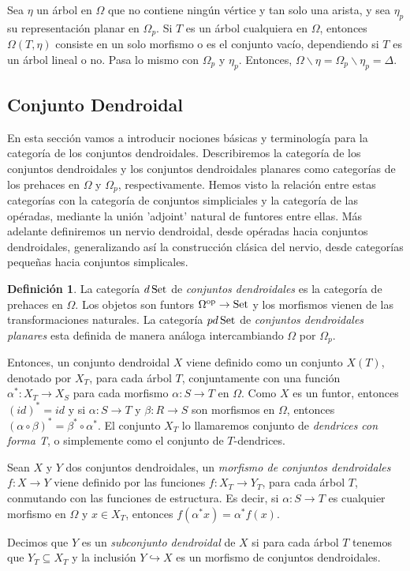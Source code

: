 \documentclass[11pt,a4paper,openright,oneside]{article}
\numberwithin{equation}{section}
\theoremstyle{definition}
\newtheorem{defi}[teo]{Definici\'on}
\newcommand{\Set}{\mathop{\rm Set}}
\begin{document}
Sea $\eta$ un \'arbol en $\Omega$ que no contiene ning\'un v\'ertice y tan solo una arista, y sea $\eta_p$ su representaci\'on planar en $\Omega_p$.
Si $T$ es un \'arbol cualquiera en $\Omega$, entonces $\Omega(T,\eta)$ consiste en un solo morfismo o es el conjunto vac\'io, dependiendo si $T$ es un \'arbol lineal o no. Pasa lo mismo con $\Omega_p$ y $\eta_p$. Entonces, $\Omega\backslash\eta = \Omega_p\backslash\eta_p = \Delta$.

\subsection{Conjunto Dendroidal}
En esta secci\'on vamos a introducir nociones b\'asicas y terminolog\'ia para la categor\'ia de los conjuntos dendroidales. Describiremos la categor\'ia de los conjuntos dendroidales y los conjuntos dendroidales planares como categor\'ias de los prehaces en $\Omega$ y $\Omega_p$, respectivamente.
Hemos visto la relaci\'on entre estas categor\'ias con la categor\'ia de conjuntos simpliciales y la categor\'ia de las op\'eradas, mediante la uni\'on 'adjoint' natural de funtores entre ellas. M\'as adelante definiremos un nervio dendroidal, desde op\'eradas hacia conjuntos dendroidales, generalizando as\'i la construcci\'on cl\'asica del nervio, desde categor\'ias peque\~{n}as hacia conjuntos simplicales.

\begin{defi}
    La categor\'ia $d\Set$ de \emph{conjuntos dendroidales} es la categor\'ia de prehaces en $\Omega$. Los objetos son funtors $\Omega^{\rm op}\to\Set$ y los morfismos vienen de las transformaciones naturales. La categor\'ia $pd\Set$ de \emph{conjuntos dendroidales planares} esta definida de manera an\'aloga intercambiando $\Omega$ por $\Omega_p$.

    Entonces, un conjunto dendroidal $X$ viene definido como un conjunto $X(T)$, denotado por $X_T$, para cada \'arbol $T$, conjuntamente con una funci\'on $\alpha^{*}\colon X_T \to X_S$ para cada morfismo $\alpha\colon S\to T$ en $\Omega$. Como $X$ es un funtor, entonces $(id)^{*}=id$ y si $\alpha\colon S\to T$ y $\beta\colon R\to S$ son morfismos en $\Omega$, entonces $(\alpha\circ\beta)^{*}=\beta^{*}\circ\alpha^{*}$. El conjunto $X_T$ lo llamaremos conjunto de \emph{dendrices con forma T}, o simplemente como el conjunto de $T$-dendrices.

    Sean $X$ y $Y$ dos conjuntos dendroidales, un \emph{morfismo de conjuntos dendroidales} $f\colon X \to Y$ viene definido por las funciones $f\colon X_T\to Y_T$, para cada \'arbol $T$, conmutando con las funciones de estructura. Es decir, si $\alpha\colon S\to T$ es cualquier morfismo en $\Omega$ y $x\in X_T$, entonces $f(\alpha^{*}x)=\alpha^{*}f(x)$.

    Decimos que $Y$ es un \emph{subconjunto dendroidal} de $X$ si para cada \'arbol $T$ tenemos que $Y_T\subseteq X_T$ y la inclusi\'on $Y \hookrightarrow X$ es un morfismo de conjuntos dendroidales.
\end{defi}
\end{document}
